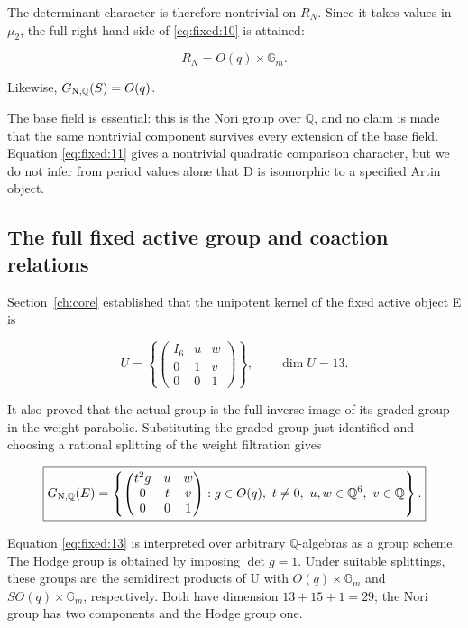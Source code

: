 \documentclass[11pt,a4paper,oneside]{article}
\theoremstyle{plain}
\theoremstyle{definition}
\theoremstyle{remark}
\numberwithin{equation}{section}
\begin{document}
The determinant character is therefore nontrivial on \(R_N\). Since it takes values in \(\mu_2\), the full right-hand side of \eqref{eq:fixed:10} is attained:

\begin{equation}
R_N=O(q)\times\mathbb G_m.              \label{eq:fixed:12}
\end{equation}

Likewise, \(G_{\rm N,\mathbb Q}(S)=O(q)\).

The base field is essential: this is the Nori group over \(\mathbb Q\), and no claim is made that the same nontrivial component survives every extension of the base field. Equation \eqref{eq:fixed:11} gives a nontrivial quadratic comparison character, but we do not infer from period values alone that D is isomorphic to a specified Artin object.


\subsection{The full fixed active group and coaction relations}\label{sec:fixed:7}

Section~\ref{ch:core} established that the unipotent kernel of the fixed active object E is

\begin{equation}
U=\left\{\begin{pmatrix}I_6&u&w\\0&1&v\\0&0&1\end{pmatrix}\right\},
 \qquad \dim U=13.
\end{equation}

It also proved that the actual group is the full inverse image of its graded group in the weight parabolic. Substituting the graded group just identified and choosing a rational splitting of the weight filtration gives

\begin{equation}
\boxed{
 G_{\rm N,\mathbb Q}(E)=
 \left\{\begin{pmatrix}t^2g&u&w\\0&t&v\\0&0&1\end{pmatrix}:
     g\in O(q),\ t\ne0,\ u,w\in\mathbb Q^6,\ v\in\mathbb Q\right\}.
 }                                                               \label{eq:fixed:13}
\end{equation}

Equation \eqref{eq:fixed:13} is interpreted over arbitrary \(\mathbb Q\)-algebras as a group scheme. The Hodge group is obtained by imposing \(\det g=1\). Under suitable splittings, these groups are the semidirect products of U with \(O(q)\times\mathbb G_m\) and \(SO(q)\times\mathbb G_m\), respectively. Both have dimension \(13+15+1=29\); the Nori group has two components and the Hodge group one.
\end{document}
